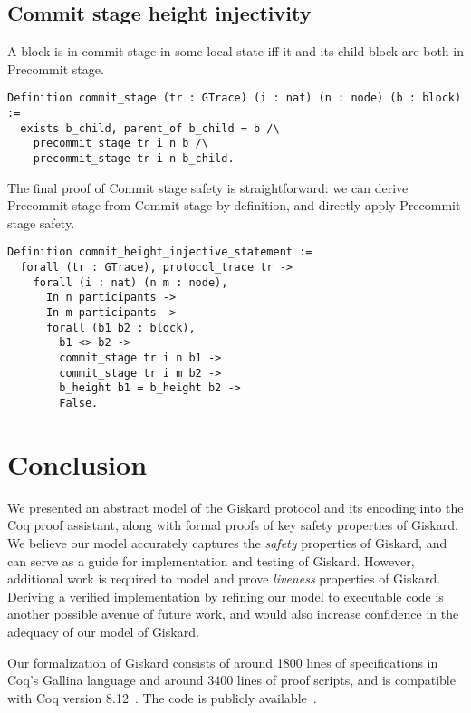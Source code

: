 \documentclass{easychair}
\begin{document}
\subsection{Commit stage height injectivity}
A block is in commit stage in some local state iff it and its child block are both in Precommit stage.
\begin{lstlisting}
Definition commit_stage (tr : GTrace) (i : nat) (n : node) (b : block) :=
  exists b_child, parent_of b_child = b /\
    precommit_stage tr i n b /\ 
    precommit_stage tr i n b_child.
\end{lstlisting}
The final proof of Commit stage safety is straightforward: we can derive Precommit stage from Commit stage by definition, and directly apply Precommit stage safety. 
\begin{lstlisting}
Definition commit_height_injective_statement :=
  forall (tr : GTrace), protocol_trace tr ->
    forall (i : nat) (n m : node),
      In n participants ->
      In m participants ->
      forall (b1 b2 : block),
        b1 <> b2 -> 
        commit_stage tr i n b1 ->
        commit_stage tr i m b2 -> 
        b_height b1 = b_height b2 ->
        False. 
\end{lstlisting}
\section{Conclusion}
\label{sec:conclusion}

We presented an abstract model of the Giskard protocol and its encoding into the Coq proof assistant, along with formal proofs of key safety properties of Giskard.
%
We believe our model accurately captures the \emph{safety} properties of Giskard, and can serve as a guide for implementation and testing of Giskard. However, additional work is required to model and prove \emph{liveness} properties of Giskard. Deriving a verified implementation by refining our model to executable code is another possible avenue of future work, and would also increase confidence in the adequacy of our model of Giskard.

Our formalization of Giskard consists of around 1800 lines of specifications in Coq's Gallina language and around 3400 lines of proof scripts, and is compatible with Coq version 8.12~\cite{Coq812}. The code is publicly available~\cite{CoqGiskard}.



\end{document}
